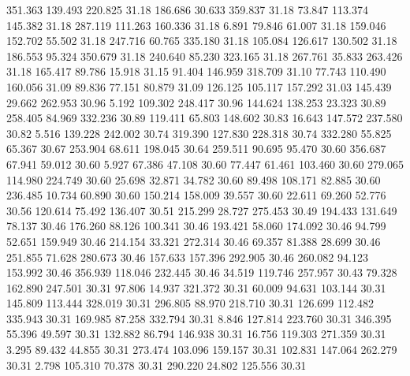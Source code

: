  351.363  139.493  220.825        31.18
 186.686   30.633  359.837        31.18
  73.847  113.374  145.382        31.18
 287.119  111.263  160.336        31.18
   6.891   79.846   61.007        31.18
 159.046  152.702   55.502        31.18
 247.716   60.765  335.180        31.18
 105.084  126.617  130.502        31.18
 186.553   95.324  350.679        31.18
 240.640   85.230  323.165        31.18
 267.761   35.833  263.426        31.18
 165.417   89.786   15.918        31.15
  91.404  146.959  318.709        31.10
  77.743  110.490  160.056        31.09
  89.836   77.151   80.879        31.09
 126.125  105.117  157.292        31.03
 145.439   29.662  262.953        30.96
   5.192  109.302  248.417        30.96
 144.624  138.253   23.323        30.89
 258.405   84.969  332.236        30.89
 119.411   65.803  148.602        30.83
  16.643  147.572  237.580        30.82
   5.516  139.228  242.002        30.74
 319.390  127.830  228.318        30.74
 332.280   55.825   65.367        30.67
 253.904   68.611  198.045        30.64
 259.511   90.695   95.470        30.60
 356.687   67.941   59.012        30.60
   5.927   67.386   47.108        30.60
  77.447   61.461  103.460        30.60
 279.065  114.980  224.749        30.60
  25.698   32.871   34.782        30.60
  89.498  108.171   82.885        30.60
 236.485   10.734   60.890        30.60
 150.214  158.009   39.557        30.60
  22.611   69.260   52.776        30.56
 120.614   75.492  136.407        30.51
 215.299   28.727  275.453        30.49
 194.433  131.649   78.137        30.46
 176.260   88.126  100.341        30.46
 193.421   58.060  174.092        30.46
  94.799   52.651  159.949        30.46
 214.154   33.321  272.314        30.46
  69.357   81.388   28.699        30.46
 251.855   71.628  280.673        30.46
 157.633  157.396  292.905        30.46
 260.082   94.123  153.992        30.46
 356.939  118.046  232.445        30.46
  34.519  119.746  257.957        30.43
  79.328  162.890  247.501        30.31
  97.806   14.937  321.372        30.31
  60.009   94.631  103.144        30.31
 145.809  113.444  328.019        30.31
 296.805   88.970  218.710        30.31
 126.699  112.482  335.943        30.31
 169.985   87.258  332.794        30.31
   8.846  127.814  223.760        30.31
 346.395   55.396   49.597        30.31
 132.882   86.794  146.938        30.31
  16.756  119.303  271.359        30.31
   3.295   89.432   44.855        30.31
 273.474  103.096  159.157        30.31
 102.831  147.064  262.279        30.31
   2.798  105.310   70.378        30.31
 290.220   24.802  125.556        30.31
